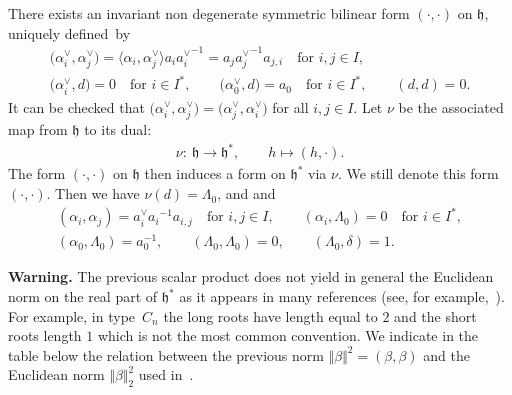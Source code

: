 \documentclass[10pt,a4paper]{amsart}
\numberwithin{equation}{section}
\newcommand{\al}{\alpha}
\newcommand{\La}{\Lambda}
\newcommand{\fh}{\mathfrak{h}}
\begin{document}
There exists an invariant non degenerate symmetric bilinear form $(\cdot,\cdot)$ on $\fh$, uniquely defined~by
\begin{gather*}
\bigl(\al_i^\vee,\al^\vee_j\bigr) = \bigl\langle\al_i,\al_j^\vee\bigr\rangle a_i{a_i^\vee}^{-1}=a_j{a_j^\vee}^{-1}a_{j,i}\quad\mbox{for $i,j\in I$},\\
\bigl(\al_i^\vee,d\bigr) = 0 \quad \mbox{for $i\in I^\ast$},\qquad
\bigl(\al_0^\vee,d\bigr) = a_0 \quad \mbox{for $i\in I^\ast$},\qquad
(d,d) = 0.
\end{gather*}
It can be checked that $\bigl(\al_i^\vee,\al_j^\vee\bigr) = \bigl(\al_j^\vee,\al_i^\vee\bigr)$ for all $i,j\in I$. Let $\nu$ be the associated map from $\fh$ to its dual:
\begin{align*}
\nu \colon \ \fh  \to  \fh^\ast,\qquad
 h \mapsto  (h,\cdot).
\end{align*}
The form $(\cdot,\cdot)$ on $\fh$ then induces a form on $\fh^\ast$ via $\nu$. We still denote this form $(\cdot,\cdot)$. Then we have $\nu(d) =\La_0$, \smash{$a_{i,j} = \frac{2(\al_i,\al_j)}{(\al_i,\al_i)}$} and \smash{$\nu\bigl(\al_i^{\vee}\bigr) = \frac{2\al_i}{(\al_i,\al_i)}$} and
\begin{gather*}
(\al_i,\al_j) = a_i^\vee{a_i}^{-1}a_{i,j}\quad\mbox{for $i,j\in I$},\qquad
(\al_i,\La_0) = 0 \quad \mbox{for $i\in I^\ast$},\\
(\al_0,\La_0) = a_0^{-1} ,\qquad
(\La_0,\La_0) = 0,\qquad
(\La_0,\delta)=1.
\end{gather*}

\textbf{Warning.} The previous scalar product does not yield in
general the Euclidean norm on the real part of $\fh^{\ast}$ as it appears in
many references (see, for example,~\cite{Bourbaki}). For example, in type~$C_{n}$
the long roots have length equal to $2$ and the short roots length $1$ which
is not the most common convention. We indicate in the table below the relation
between the previous norm $ \Vert \beta \Vert ^{2}=(\beta,\beta)$ and
the Euclidean norm $ \Vert \beta \Vert _{2}^{2}$ used in~\cite{Bourbaki}.
\end{document}
